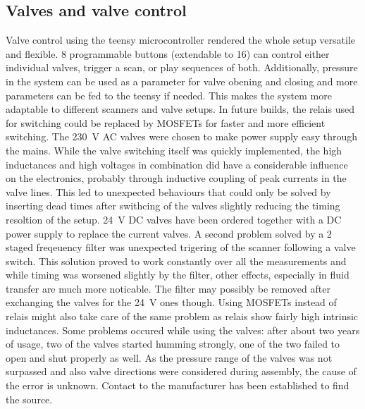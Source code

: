         \subsection{Valves and valve control}
            Valve control using the teensy microcontroller rendered the whole setup versatile and flexible. 8 programmable buttons (extendable to 16) can control either individual valves, trigger a scan, or play sequences of both. Additionally, pressure in the system can be used as a parameter for valve obening and closing and more parameters can be fed to the teensy if needed. This makes the system more adaptable to different scanners and valve setups. In future builds, the relais used for switching could be replaced by MOSFETs for faster and more efficient switching. 
            The \SI{230}{\volt} AC valves were chosen to make power supply easy through the mains. While the valve switching itself was quickly implemented, the high inductances and high voltages in combination did have a considerable influence on the electronics, probably through inductive coupling of peak currents in the valve lines. This led to unexpected behaviours that could only be solved by inserting dead times after swithcing of the valves slightly reducing the timing resoltion of the setup. \SI{24}{\volt} DC valves have been ordered together with a DC power supply to replace the current valves. A second problem solved by a 2 staged freqeuency filter was unexpected trigering of the scanner following a valve switch. This solution proved to work constantly over all the measurements and while timing was worsened slightly by the filter, other effects, especially in fluid transfer are much more noticable. The filter may possibly be removed after exchanging the valves for the \SI{24}{\volt} ones though. Using MOSFETs instead of relais might also take care of the same problem as relais show fairly high intrinsic inductances. 
            Some problems occured while using the valves: after about two years of usage, two of the valves started humming strongly, one of the two failed to open and shut properly as well. As the pressure range of the valves was not surpassed and also valve directions were considered during assembly, the cause of the error is unknown. Contact to the manufacturer has been established to find the source.

